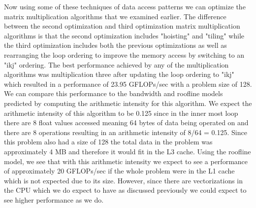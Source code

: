 \documentclass{article}
\begin{document}
Now using some of these techniques of data access patterns we can optimize the matrix multiplication algorithms that we examined earlier. The difference between the second optimization and third optimization matrix multiplication algorithms is that the second optimization includes "hoisting" and "tiling" while the third optimization includes both the previous optimizations as well as rearranging the loop ordering to improve the memory access by switching to an "ikj" ordering. The best performance achieved by any of the multiplication algorithms was multiplication three after updating the loop ordering to "ikj" which resulted in a performance of 23.95 GFLOPs/sec with a problem size of 128. We can compare this performance to the bandwidth and roofline models predicted by computing the arithmetic intensity for this algorithm. We expect the arithmetic intensity of this algorithm to be 0.125 since in the inner most loop there are 8 float values accessed meaning 64 bytes of data being operated on and there are 8 operations resulting in an arithmetic intensity of 8/64 = 0.125. Since this problem also had a size of 128 the total data in the problem was approximately 4 MB and therefore it would fit in the L3 cache. Using the roofline model, we see that with this arithmetic intensity we expect to see a performance of approximately 20 GFLOPs/sec if the whole problem were in the L1 cache which is not expected due to its size. However, since there are vectorizations in the CPU which we do expect to have as discussed previously we could expect to see higher performance as we do. 

\end{document}
